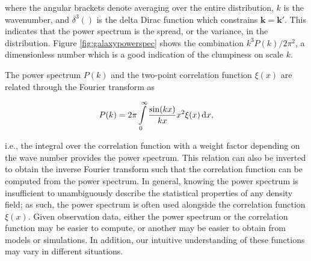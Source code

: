 \documentclass[a4paper,11pt]{article}
\begin{document}
{\noindent}where the angular brackets denote averaging over the entire distribution, $k$ is the wavenumber, and $\delta^3()$ is the delta Dirac function which constrains $\mathbf{k}=\mathbf{k'}$. This indicates that the power spectrum is the spread, or the variance, in the distribution. Figure \ref{fig:galaxypowerspec} shows the combination $k^3P(k)/2\pi^2$, a dimensionless number which is a good indication of the clumpiness on scale $k$.

{\noindent}The power spectrum $P(k)$ and the two-point correlation function $\xi(x)$ are related through the Fourier transform as

\begin{align*}
    P(k) = 2\pi \int\limits_0^\infty \frac{\sin(kx)}{kx} x^2 \xi(x)\,{\rm d}x,
\end{align*}

{\noindent}i.e., the integral over the correlation function with a weight factor depending on the wave number provides the power spectrum. This relation can also be inverted to obtain the inverse Fourier transform such that the correlation function can be computed from the power spectrum. In general, knowing the power spectrum is insufficient to unambiguously describe the statistical properties of any density field; as such, the power spectrum is often used alongside the correlation function $\xi(x)$. Given observation data, either the power spectrum or the correlation function may be easier to compute, or another may be easier to obtain from models or simulations. In addition, our intuitive understanding of these functions may vary in different situations.
\end{document}
